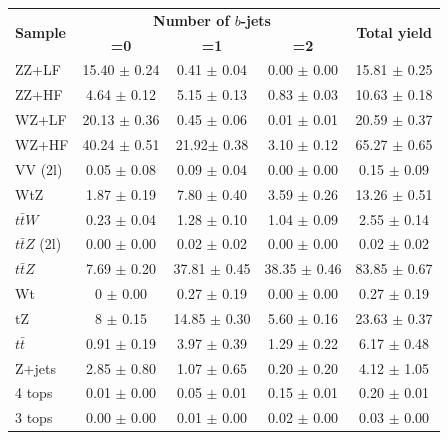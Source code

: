 \begin{table}[!h]
	\begin{tabular}{|l|c|c|c|c|}
		\hline
		\multirow{2}{*}{\textbf{Sample}}      & \multicolumn{3}{|c|}{\textbf{Number of $b$-jets}} & \multirow{2}{*}{\textbf{Total yield}}\\
		\cline{2-4}
		& \textbf{=0}     & \textbf{=1}     & \textbf{=2}    &\\                    
		\hline   
		ZZ+LF &                 15.40 $\pm$ 0.24  & 0.41 $\pm$ 0.04   & 0.00 $\pm$ 0.00   &  15.81 $\pm$ 0.25  \\
		ZZ+HF &                 4.64  $\pm$ 0.12  & 5.15 $\pm$ 0.13   & 0.83 $\pm$ 0.03   &  10.63 $\pm$ 0.18  \\
		WZ+LF &                 20.13 $\pm$ 0.36  & 0.45 $\pm$ 0.06   & 0.01 $\pm$ 0.01   &  20.59 $\pm$ 0.37  \\
		WZ+HF &                 40.24 $\pm$ 0.51  & 21.92$\pm$ 0.38   & 3.10 $\pm$ 0.12   &  65.27 $\pm$ 0.65  \\
		VV (2l) &               0.05 $\pm$ 0.08   & 0.09 $\pm$ 0.04   & 0.00 $\pm$ 0.00   &  0.15 $\pm$ 0.09   \\
		WtZ &                   1.87 $\pm$ 0.19   & 7.80 $\pm$ 0.40   & 3.59 $\pm$ 0.26   &  13.26 $\pm$ 0.51  \\
		$t\bar{t}W$ &           0.23 $\pm$ 0.04   & 1.28 $\pm$ 0.10   & 1.04 $\pm$ 0.09   &  2.55 $\pm$ 0.14   \\
		$t\bar{t}Z$ (2l) &      0.00 $\pm$ 0.00   & 0.02 $\pm$ 0.02   & 0.00 $\pm$ 0.00   &  0.02 $\pm$ 0.02   \\
		$t\bar{t}Z$ &           7.69 $\pm$ 0.20  & 37.81 $\pm$ 0.45  & 38.35 $\pm$ 0.46   &  83.85 $\pm$ 0.67  \\
		Wt &                    0 $\pm$ 0.00      & 0.27 $\pm$ 0.19   & 0.00 $\pm$ 0.00   &  0.27 $\pm$ 0.19   \\
		tZ &                    8 $\pm$ 0.15      & 14.85 $\pm$ 0.30  & 5.60 $\pm$ 0.16   &  23.63 $\pm$ 0.37  \\
		$t\bar{t}$ &            0.91 $\pm$ 0.19   & 3.97 $\pm$ 0.39   & 1.29 $\pm$ 0.22   &  6.17 $\pm$ 0.48   \\
		Z+jets &                2.85 $\pm$ 0.80   & 1.07 $\pm$ 0.65   & 0.20 $\pm$ 0.20   &  4.12 $\pm$ 1.05   \\
		4 tops &                0.01 $\pm$ 0.00   & 0.05 $\pm$ 0.01   & 0.15 $\pm$ 0.01   &  0.20 $\pm$ 0.01   \\
		3 tops &                0.00 $\pm$ 0.00   & 0.01 $\pm$ 0.00   & 0.02 $\pm$ 0.00   &  0.03 $\pm$ 0.00   \\

\end{tabular}
\end{table}
